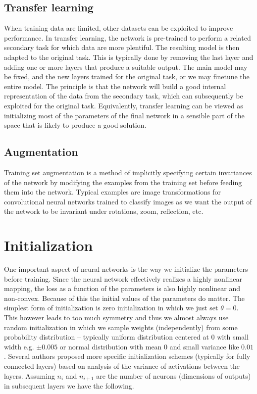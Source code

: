 \documentclass{myclass}
\begin{document}
\subsection{Transfer learning}

When training data are limited, other datasets can be exploited to improve performance. In transfer
learning, the network is pre-trained to perform a related secondary task for which data are more
plentiful. The resulting model is then adapted to the original task. This is typically done by
removing the last layer and adding one or more layers that produce a suitable output. The main model
may be fixed, and the new layers trained for the original task, or we may finetune the entire model.
The principle is that the network will build a good internal representation of the data from the
secondary task, which can subsequently be exploited for the original task. Equivalently, transfer
learning can be viewed as initializing most of the parameters of the final network in a sensible
part of the space that is likely to produce a good solution.


\subsection{Augmentation}

Training set augmentation is a method of implicitly specifying certain invariances of the network by
modifying the examples from the training set before feeding them into the network. Typical examples
are image transformations for convolutional neural networks trained to classify images as we want
the output of the network to be invariant under rotations, zoom, reflection, etc.


\section{Initialization}

One important aspect of neural networks is the way we initialize the parameters before training.
Since the neural network effectively realizes a highly nonlinear mapping, the loss as a function of
the parameters is also highly nonlinear and non-convex. Because of this the initial values of the
parameters do matter. The simplest form of initialization is zero initialization in which we just
set \(\theta = 0\). This however leads to too much symmetry and thus we almost always use random
initialization in which we sample weights (independently) from some probability distribution --
typically uniform distribution centered at 0 with small width e.g. \(\pm0.005\) or normal
distribution with mean 0 and small variance like \(0.01\). Several authors proposed more specific
initialization schemes (typically for fully connected layers) based on analysis of the variance of
activations between the layers. Assuming \(n_i\) and \(n_{i+1}\) are the number of neurons
(dimensions of outputs) in subsequent layers we have the following.
\end{document}
